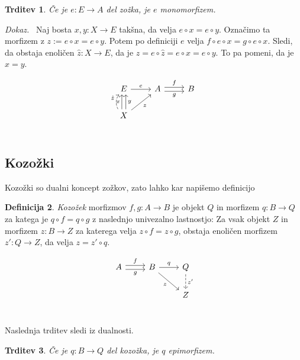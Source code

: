 \documentclass[12pt,a4paper]{book}
\theoremstyle{definition}
\newtheorem{definicija}{Definicija}[chapter]
\theoremstyle{plain}
\newtheorem{trditev}[definicija]{Trditev}
\newenvironment{dokaz}{\emph{Dokaz.}\ }{\hspace{\fill}{$\Box$}}
\theoremstyle{definition}
\theoremstyle{remark}
\begin{document}
\begin{trditev}
Če je $e : E \to A$ del zožka, je $e$ monomorfizem.
\end{trditev}
\begin{dokaz}
Naj bosta $x,y : X \to E$ takšna, da velja $e \circ x = e \circ y$. Označimo ta morfizem z $z := e \circ x = e \circ y$. Potem po definiciji $e$ velja $f \circ e \circ x = g \circ e \circ x$. Sledi, da obstaja enoličen $\hat{z} : X \to E$, da je $z = e \circ \hat{z} = e \circ x = e \circ y$. To pa pomeni, da je $x = y$.

$$\begin{tikzcd}
E \ar[r, "e"] & A \ar[r, shift left, "f"] \ar[r, shift right, "g"'] & B \\
X \ar[u, bend left, shift left, dashed, "\hat{z}"] \ar[u, shift left, "x"] \ar[u, shift right, "y"'] \ar[ur, "z"'] \\
\end{tikzcd}$$

\end{dokaz}


\subsection{Kozožki}

Kozožki so dualni koncept zožkov, zato lahko kar napišemo definicijo

\begin{definicija}
\emph{Kozožek} morfizmov $f,g:A \to B$ je objekt $Q$ in morfizem $q: B \to Q$ za katega je $q \circ f = q \circ g$ z naslednjo univezalno lastnostjo: Za vsak objekt $Z$ in morfizem $z : B \to Z$ za katerega velja $z \circ f = z \circ g$, obstaja enoličen morfizem $z' : Q \to Z$, da velja $z = z' \circ q$.

$$\begin{tikzcd}
A \ar[r, shift left, "f"] \ar[r, shift right, "g"'] & B \ar[r, "q"] \ar[dr, "z"'] & Q \ar[d, dashed, "z'"] \\
& & Z \\
\end{tikzcd}$$

\end{definicija}

Naslednja trditev sledi iz dualnosti.

\begin{trditev}
Če je $q : B \to Q$ del kozožka, je $q$ epimorfizem.
\end{trditev}
\end{document}
